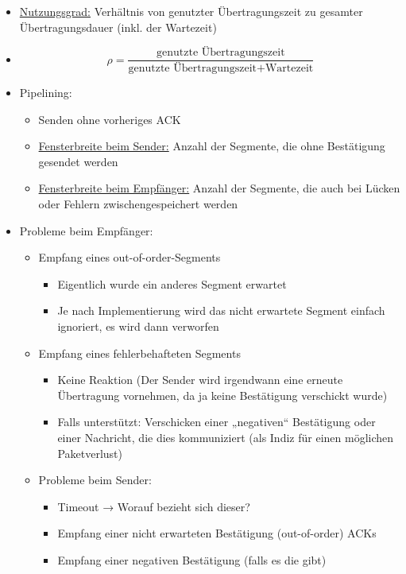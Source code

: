 \begin{itemize}
    \item \underline{Nutzungsgrad:} Verhältnis von genutzter Übertragungszeit zu gesamter Übertragungsdauer (inkl. der Wartezeit)
    \item \[\rho = \frac{\textrm{genutzte Übertragungszeit}}{\textrm{genutzte Übertragungszeit} + \textrm{Wartezeit}}\]
\end{itemize}

\begin{itemize}
    \item Pipelining:
    \begin{itemize}
        \item Senden ohne vorheriges ACK
        \item \underline{Fensterbreite beim Sender:} Anzahl der Segmente, die ohne Bestätigung gesendet werden
        \item \underline{Fensterbreite beim Empfänger:} Anzahl der Segmente, die auch bei Lücken oder Fehlern zwischengespeichert werden
    \end{itemize}
    \item Probleme beim Empfänger:
    \begin{itemize}
        \item Empfang eines out-of-order-Segments
        \begin{itemize}
            \item Eigentlich wurde ein anderes Segment erwartet
            \item Je nach Implementierung wird das nicht erwartete Segment einfach ignoriert, es wird dann verworfen
        \end{itemize}
        \item Empfang eines fehlerbehafteten Segments
        \begin{itemize}
            \item Keine Reaktion (Der Sender wird irgendwann eine erneute Übertragung vornehmen, da ja keine Bestätigung verschickt wurde)
            \item Falls unterstützt: Verschicken einer „negativen“ Bestätigung oder einer Nachricht, die dies kommuniziert (als Indiz für einen möglichen Paketverlust)
        \end{itemize}
        \item Probleme beim Sender:
        \begin{itemize}
            \item Timeout → Worauf bezieht sich dieser?
            \item Empfang einer nicht erwarteten Bestätigung (out-of-order) ACKs
            \item Empfang einer negativen Bestätigung (falls es die gibt)
        \end{itemize}
    \end{itemize}
\end{itemize}

